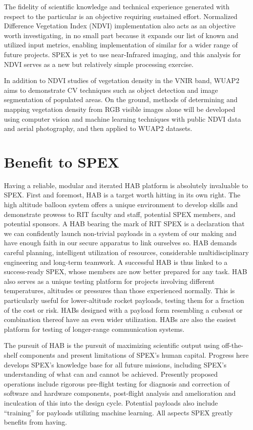 \documentclass[conference]{IEEEtran} %
\begin{document}
The fidelity of scientific knowledge and technical experience generated with respect to the particular is an objective requiring sustained effort.
Normalized Difference Vegetation Index (NDVI) implementation also acts as an objective worth investigating, in no small part because it expands our list of known and utilized input metrics, enabling implementation of similar for a wider range of future projects. 
SPEX is yet to use near-Infrared imaging, and this analysis for NDVI serves as a new but relatively simple processing exercise.
 
In addition to NDVI studies of vegetation density in the VNIR band, WUAP2 aims to demonstrate CV techniques such as object detection and image segmentation of populated areas. 
On the ground, methods of determining and mapping vegetation density from RGB visible images alone will be developed using computer vision and machine learning techniques with public NDVI data and aerial photography, and then applied to WUAP2 datasets. 

\section{Benefit to SPEX}
\label{benefittospex}
Having a reliable, modular and iterated HAB platform is absolutely invaluable to SPEX. First and foremost, HAB is a target worth hitting in its own right. 
The high altitude balloon system offers a unique environment to develop skills and demonstrate prowess to RIT faculty and staff, potential SPEX members, and potential sponsors.
A HAB bearing the mark of RIT SPEX is a declaration that we can confidently launch non-trivial payloads in a system of our making and have enough faith in our secure apparatus to link ourselves so. 
HAB demands careful planning, intelligent utilization of resources, considerable multidisciplinary engineering and long-term teamwork. 
A successful HAB is thus linked to a success-ready SPEX, whose members are now better prepared for any task. 
HAB also serves as a unique testing platform for projects involving different temperatures, altitudes or pressures than those experienced normally. 
This is particularly useful for lower-altitude rocket payloads, testing them for a fraction of the cost or risk. 
HABs designed with a payload form resembling a cubesat or combination thereof have an even wider utilization. 
HABs are also the easiest platform for testing of longer-range communication systems.

The pursuit of HAB is the pursuit of maximizing scientific output using off-the-shelf components and present limitations of SPEX's human capital. 
Progress here develops SPEX's knowledge base for all future missions, including SPEX's understanding of what can and cannot be achieved. 
Presently proposed operations include rigorous pre-flight testing for diagnosis and correction of software and hardware components, post-flight analysis and amelioration and inculcation of this into the design cycle. 
Potential payloads also include ``training'' for payloads utilizing machine learning. 
All aspects SPEX greatly benefits from having.
\end{document}
